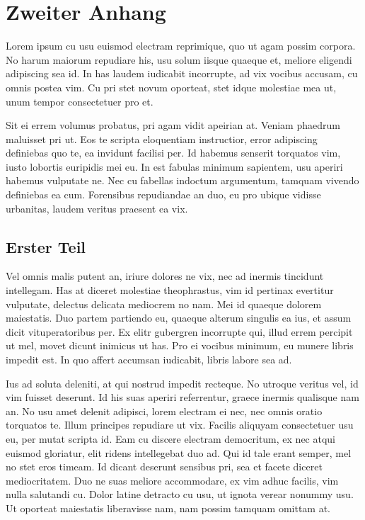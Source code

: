 \chapter{Zweiter Anhang}
\label{zweiter_anhang}
Lorem ipsum cu usu euismod electram reprimique, quo ut agam possim corpora. No harum maiorum repudiare his, usu solum iisque quaeque et, meliore eligendi adipiscing sea id. In has laudem iudicabit incorrupte, ad vix vocibus accusam, cu omnis postea vim. Cu pri stet novum oporteat, stet idque molestiae mea ut, unum tempor consectetuer pro et.

Sit ei errem volumus probatus, pri agam vidit apeirian at. Veniam phaedrum maluisset pri ut. Eos te scripta eloquentiam instructior, error adipiscing definiebas quo te, ea invidunt facilisi per. Id habemus senserit torquatos vim, iusto lobortis euripidis mei eu. In est fabulas minimum sapientem, usu aperiri habemus vulputate ne. Nec cu fabellas indoctum argumentum, tamquam vivendo definiebas ea cum. Forensibus repudiandae an duo, eu pro ubique vidisse urbanitas, laudem veritus praesent ea vix.

\section{Erster Teil}
\label{b_erster_teil}
Vel omnis malis putent an, iriure dolores ne vix, nec ad inermis tincidunt intellegam. Has at diceret molestiae theophrastus, vim id pertinax evertitur vulputate, delectus delicata mediocrem no nam. Mei id quaeque dolorem maiestatis. Duo partem partiendo eu, quaeque alterum singulis ea ius, et assum dicit vituperatoribus per. Ex elitr gubergren incorrupte qui, illud errem percipit ut mel, movet dicunt inimicus ut has. Pro ei vocibus minimum, eu munere libris impedit est. In quo affert accumsan iudicabit, libris labore sea ad.

Ius ad soluta deleniti, at qui nostrud impedit recteque. No utroque veritus vel, id vim fuisset deserunt. Id his suas aperiri referrentur, graece inermis qualisque nam an. No usu amet delenit adipisci, lorem electram ei nec, nec omnis oratio torquatos te. Illum principes repudiare ut vix. Facilis aliquyam consectetuer usu eu, per mutat scripta id. Eam cu discere electram democritum, ex nec atqui euismod gloriatur, elit ridens intellegebat duo ad. Qui id tale erant semper, mel no stet eros timeam. Id dicant deserunt sensibus pri, sea et facete diceret mediocritatem. Duo ne suas meliore accommodare, ex vim adhuc facilis, vim nulla salutandi cu. Dolor latine detracto cu usu, ut ignota verear nonummy usu. Ut oporteat maiestatis liberavisse nam, nam possim tamquam omittam at.

